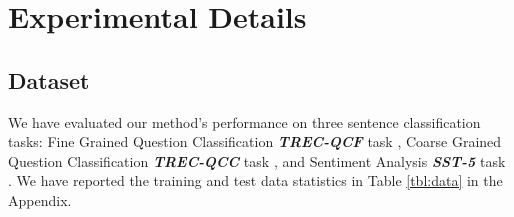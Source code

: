 \documentclass[11pt]{article}
\begin{document}





\section{Experimental Details}
\subsection{Dataset}
We have evaluated our method's performance on three sentence classification tasks: Fine Grained Question Classification \textit{\textbf{TREC-QCF}} task \cite{lang1995newsweeder}, Coarse Grained Question Classification \textit{\textbf{TREC-QCC}} task \cite{li2006learning}, and Sentiment Analysis \textbf{\textit{SST-5}} task \cite{socher2013recursive}. We have reported the training and test data statistics in Table \ref{tbl:data} in the Appendix.
\end{document}

